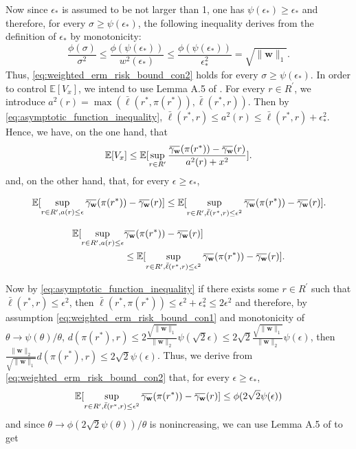 \documentclass[letterpaper]{article} %
\def\DoubleColumn{}
\def\DoubleColumnEnd{}
\def\SingleColumn{}
\def\SingleColumnEnd{}
\newcommand{\E}{\mathbb{E}}
\newcommand{\overbar}[1]{\mkern 1.5mu\overline{\mkern-1.5mu#1\mkern-1.5mu}\mkern 1.5mu}
\newcommand*\cen[1]{\overbar{#1}}
\newcommand{\weight}{\mathbf{w}}
\newcommand{\relossf}{\bar{\ell}}
\newcommand{\cenprocess}[1]{\cen{\gamma_{#1}}}
\newcommand{\normo}[1]{\|#1\|_1}
\begin{document}
    Now since $\epsilon_*$ is assumed to be not larger than 1, one has $\psi(\epsilon_*)\ge \epsilon_*$ and therefore, for every $\sigma\ge \psi(\epsilon_*)$, the following inequality derives from the definition of $\epsilon_*$ by monotonicity:
    \[\frac{\phi(\sigma)}{\sigma^2}\le \frac{\phi(\psi(\epsilon_*))}{w^2(\epsilon_*)}\le \frac{\phi(\psi(\epsilon_*))}{\epsilon_*^2}=\sqrt{\normo{\weight{}}}.\]
    Thus, \eqref{eq:weighted_erm_risk_bound_con2} holds for every $\sigma\ge \psi(\epsilon_*)$. In order to control $\E[V_x]$, we intend to use Lemma A.5 of \cite{Massart2006}. 
    For every $r\in R^\prime$, we introduce $a^2(r)=\max(\relossf(r^*,\pi(r^*)),\relossf(r^*,r))$. Then by \eqref{eq:asymptotic_function_inequality}, $\relossf(r^*,r)\le a^2(r)\le \relossf(r^*,r)+\epsilon_*^2$. Hence, we have, on the one hand, that
    \[\E[V_x]\le \E[\sup_{r\in R^\prime}\frac{\cenprocess{\weight}(\pi(r^*))-\cenprocess{\weight}(r)}{a^2(r)+x^2}].\]
    and, on the other hand, that, for every $\epsilon\ge \epsilon_*$,
    \SingleColumn
    \[\E[\sup_{r\in R^\prime,a(r)\le \epsilon}\cenprocess{\weight}(\pi(r^*))-\cenprocess{\weight}(r)]\le \E[\sup_{r\in R^\prime,\relossf(r^*,r)\le \epsilon^2}\cenprocess{\weight}(\pi(r^*))-\cenprocess{\weight}(r)].\]
    \SingleColumnEnd
    \DoubleColumn
    \begin{align*}
        \E[\sup_{r\in R^\prime,a(r)\le \epsilon}&\cenprocess{\weight}(\pi(r^*))-\cenprocess{\weight}(r)]\\
        &\le \E[\sup_{r\in R^\prime,\relossf(r^*,r)\le \epsilon^2}\cenprocess{\weight}(\pi(r^*))-\cenprocess{\weight}(r)].
    \end{align*}
    \DoubleColumnEnd
    Now by \eqref{eq:asymptotic_function_inequality} if there exists some $r\in R^\prime$ such that $\relossf(r^*,r)\le \epsilon^2$, then $\relossf(r^*,\pi(r^*))\le \epsilon^2+\epsilon_*^2\le 2\epsilon^2$ and therefore, by assumption \eqref{eq:weighted_erm_risk_bound_con1} and monotonicity of $\theta\to \psi(\theta)/\theta$, $d(\pi(r^*),r)\le 2\frac{\sqrt{\normo{\weight{}}}}{\|\weight{}\|_2}\psi(\sqrt{2}\epsilon)\le 2\sqrt{2}\frac{\sqrt{\normo{\weight{}}}}{\|\weight{}\|_2}\psi(\epsilon)$, then $\frac{\|\weight{}\|_2}{\sqrt{\normo{\weight{}}}}d(\pi(r^*),r)\le 2\sqrt{2}\psi(\epsilon)$. Thus, we derive from \eqref{eq:weighted_erm_risk_bound_con2} that, for every $\epsilon\ge \epsilon_*$,
    \[\E[\sup_{r\in R^\prime,\relossf(r^*,r)\le \epsilon^2}\cenprocess{\weight}(\pi(r^*))-\cenprocess{\weight}(r)]\le \phi(2\sqrt{2}\psi(\epsilon))\]
    and since $\theta\to \phi(2\sqrt{2}\psi(\theta))/\theta$ is nonincreasing, we can use Lemma A.5 of \cite{Massart2006} to get
\end{document}
